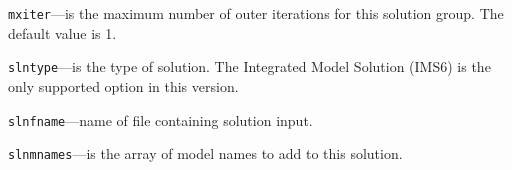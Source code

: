 \item \texttt{mxiter}---is the maximum number of outer iterations for this solution group.  The default value is 1.

\item \texttt{slntype}---is the type of solution.  The Integrated Model Solution (IMS6) is the only supported option in this version.

\item \texttt{slnfname}---name of file containing solution input.

\item \texttt{slnmnames}---is the array of model names to add to this solution.


